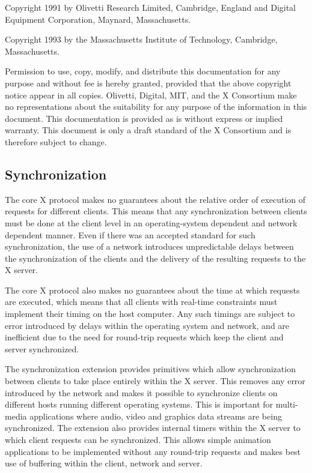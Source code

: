 Copyright 1991 by Olivetti Research Limited, Cambridge, England and
Digital Equipment Corporation, Maynard, Massachusetts.

Copyright 1993 by the Massachusetts Institute of Technology,
Cambridge, Massachusetts.

{\small Permission to use, copy, modify, and distribute this documentation
for any purpose and without fee is hereby granted, provided that the above
copyright notice appear in all copies. Olivetti, Digital, MIT, and the
X Consortium
make no representations about the suitability for any purpose of the
information in this document. This documentation is provided as is without
express or implied warranty. This document is only a draft standard of the
X Consortium and is therefore subject to change.}

\eject

\subsection*{Synchronization}

The core X protocol makes no guarantees about the relative order of execution
of requests for different clients. This means that any synchronization between
clients must be done at the client level in an operating-system dependent and
network dependent manner. Even if there was an accepted standard for such
synchronization, the use of a network introduces unpredictable delays between
the synchronization of the clients and the delivery of the resulting requests
to the X server.

The core X protocol also makes no guarantees about the time at which requests
are executed, which means that all clients with real-time constraints must
implement their timing on the host computer. Any such timings are subject to
error introduced by delays within the operating system and network, and are
inefficient due to the need for round-trip requests which keep the client and
server synchronized.

The synchronization extension provides primitives which allow synchronization
between clients to take place entirely within the X server. This removes any
error introduced by the network and makes it possible to synchronize clients
on different hosts running different operating systems. This is important for
multi-media applications where audio, video and graphics data streams are
being synchronized. The extension also provides internal timers within the X
server to which client requests can be synchronized. This allows simple
animation applications to be implemented without any round-trip requests and
makes best use of buffering within the client, network and server.

